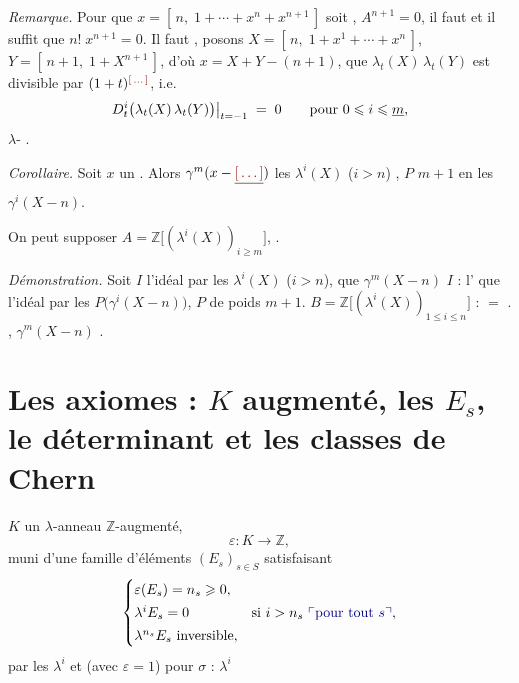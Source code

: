 \documentclass[11pt,a4paper]{article}
\begin{document}
\emph{Remarque.} Pour que
$x = [\,n,\; 1 + \cdots + x^{n} + x^{n+1}\,]$ soit \ill{}, \ill{}
$A^{n+1} = 0$, il faut et il suffit que \ill{} $n!\;x^{n+1} = 0$. Il faut
\ill{}, posons $X = [\,n,\; 1 + x^{1} + \cdots + x^{n}\,]$,
$Y = [\,n+1,\; 1 + X^{n+1}\,]$, d'où $x = X + Y - (n+1)$, que
$\lambda_{t}(X)\,\lambda_{t}(Y)$ est divisible par $(1+t)^{\ill{}}$, i.e.
\[
  D^{i}_{t}\bigl(\lambda_{t}(X)\,\lambda_{t}(Y)\bigr)\big|_{t=-1} \;=\; 0
  \qquad \text{pour } 0 \leqslant i \leqslant \uncertain{m} ,
\]
\struck{\ill{}} \ill{} $\lambda$-\ill{} \ill{}.

\emph{Corollaire.} Soit $x$ un \ill{} \struck{\ill{}}  
. Alors $\gamma^{m}(x - \struck{\ill{}})$ \ill{}
\ill{} \ill{} les $\lambda^{i}(X)$ ($i > n$) 
, $P$ \ill{} \ill{} \ill{}
\emph{$m+1$} en les $\gamma^{i}(X - n)$.

On peut supposer $A = \mathbb{Z}\bigl[(\lambda^{i}(X))_{i \geqslant m}\bigr]$,
 .

\emph{Démonstration.} Soit $I$ l'idéal \ill{} par les $\lambda^{i}(X)$
($i > n$), \ill{} que $\gamma^{m}(X - n)$ \struck{\ill{}} $I$ \ill{} :
l'\ill{}  que \ill{} l'idéal  par les
$P\bigl(\gamma^{i}(X - n)\bigr)$, $P$  de poids $m+1$.
 \ill{} \ill{} $B = \mathbb{Z}\bigl[(\lambda^{i}(X))_{1 \leqslant i \leqslant n}\bigr]$ :
 \ill{} $=$ \ill{} \ill{}. \ill{} \ill{} \ill{},
$\gamma^{m}(X - n)$ \ill{} .

\section*{Les axiomes : $K$ augmenté, les $E_{s}$, le déterminant et les classes de Chern}


$K$ un $\lambda$-anneau $\mathbb{Z}$-augmenté,
\[
  \varepsilon : K \longrightarrow \mathbb{Z} ,
\]
muni d'une famille d'éléments $(E_{s})_{s \in S}$ satisfaisant
\[
  \begin{cases}
    \varepsilon(E_{s}) = n_{s} \geqslant 0, \\[2pt]
    \lambda^{i} E_{s} = 0 & \text{si } i > n_{s} \ \text{\add{pour tout $s$}}, \\[2pt]
    \lambda^{n_{s}} E_{s} \text{ inversible},
  \end{cases}
\]
 par les $\lambda^{i}$ et (avec $\varepsilon = 1$) pour
$\sigma$ : $\lambda^{i}$ \ill{}
\end{document}
